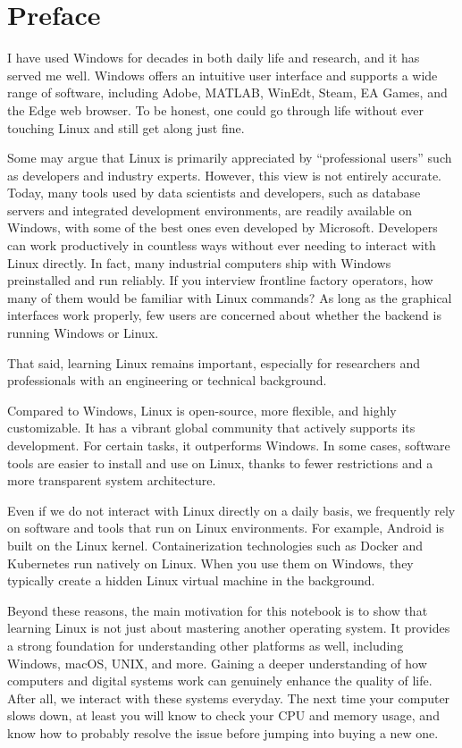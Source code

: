 \chapter*{Preface}

I have used Windows for decades in both daily life and research, and it has served me well. Windows offers an intuitive user interface and supports a wide range of software, including Adobe, MATLAB, WinEdt, Steam, EA Games, and the Edge web browser. To be honest, one could go through life without ever touching Linux and still get along just fine.

Some may argue that Linux is primarily appreciated by ``professional users'' such as developers and industry experts. However, this view is not entirely accurate. Today, many tools used by data scientists and developers, such as database servers and integrated development environments, are readily available on Windows, with some of the best ones even developed by Microsoft. Developers can work productively in countless ways without ever needing to interact with Linux directly. In fact, many industrial computers ship with Windows preinstalled and run reliably. If you interview frontline factory operators, how many of them would be familiar with Linux commands? As long as the graphical interfaces work properly, few users are concerned about whether the backend is running Windows or Linux.

That said, learning Linux remains important, especially for researchers and professionals with an engineering or technical background.

Compared to Windows, Linux is open-source, more flexible, and highly customizable. It has a vibrant global community that actively supports its development. For certain tasks, it outperforms Windows. In some cases, software tools are easier to install and use on Linux, thanks to fewer restrictions and a more transparent system architecture.

Even if we do not interact with Linux directly on a daily basis, we frequently rely on software and tools that run on Linux environments. For example, Android is built on the Linux kernel. Containerization technologies such as Docker and Kubernetes run natively on Linux. When you use them on Windows, they typically create a hidden Linux virtual machine in the background.

Beyond these reasons, the main motivation for this notebook is to show that learning Linux is not just about mastering another operating system. It provides a strong foundation for understanding other platforms as well, including Windows, macOS, UNIX, and more. Gaining a deeper understanding of how computers and digital systems work can genuinely enhance the quality of life. After all, we interact with these systems everyday. The next time your computer slows down, at least you will know to check your CPU and memory usage, and know how to probably resolve the issue before jumping into buying a new one.

